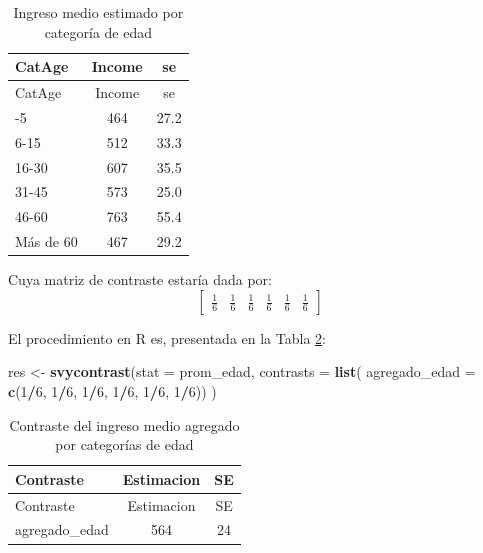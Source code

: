 \documentclass[
  spanish,
  12pt,
]{book}
\newenvironment{Shaded}{\begin{snugshade}}{\end{snugshade}}
\newcommand{\AttributeTok}[1]{\textcolor[rgb]{0.13,0.29,0.53}{#1}}
\newcommand{\DecValTok}[1]{\textcolor[rgb]{0.00,0.00,0.81}{#1}}
\newcommand{\FunctionTok}[1]{\textcolor[rgb]{0.13,0.29,0.53}{\textbf{#1}}}
\newcommand{\NormalTok}[1]{#1}
\newcommand{\OtherTok}[1]{\textcolor[rgb]{0.56,0.35,0.01}{#1}}
\newcommand{\SpecialCharTok}[1]{\textcolor[rgb]{0.81,0.36,0.00}{\textbf{#1}}}
\begin{document}
\begin{longtable}[]{@{}lcc@{}}
\caption{\label{tab:tab-prom-edad}Ingreso medio estimado por categoría de edad}\tabularnewline
\toprule\noalign{}
CatAge & Income & se \\
\midrule\noalign{}
\endfirsthead
\toprule\noalign{}
CatAge & Income & se \\
\midrule\noalign{}
\endhead
\bottomrule\noalign{}
\endlastfoot
0-5 & 464 & 27.2 \\
6-15 & 512 & 33.3 \\
16-30 & 607 & 35.5 \\
31-45 & 573 & 25.0 \\
46-60 & 763 & 55.4 \\
Más de 60 & 467 & 29.2 \\
\end{longtable}

Cuya matriz de contraste estaría dada por:
\[
\left[\begin{array}{cccccc}
\frac{1}{6} & \frac{1}{6} & \frac{1}{6} & \frac{1}{6} & \frac{1}{6} & \frac{1}{6}
\end{array}\right]
\]

El procedimiento en R es, presentada en la Tabla \ref{tab:tab-contraste-edad}:

\begin{Shaded}
\begin{Highlighting}[]
\NormalTok{res }\OtherTok{\textless{}{-}} \FunctionTok{svycontrast}\NormalTok{(}\AttributeTok{stat =}\NormalTok{ prom\_edad,}
                   \AttributeTok{contrasts =} \FunctionTok{list}\NormalTok{(}
                      \AttributeTok{agregado\_edad =} \FunctionTok{c}\NormalTok{(}\DecValTok{1}\SpecialCharTok{/}\DecValTok{6}\NormalTok{, }\DecValTok{1}\SpecialCharTok{/}\DecValTok{6}\NormalTok{, }\DecValTok{1}\SpecialCharTok{/}\DecValTok{6}\NormalTok{, }\DecValTok{1}\SpecialCharTok{/}\DecValTok{6}\NormalTok{, }\DecValTok{1}\SpecialCharTok{/}\DecValTok{6}\NormalTok{, }\DecValTok{1}\SpecialCharTok{/}\DecValTok{6}\NormalTok{))}
\NormalTok{                   )}
\end{Highlighting}
\end{Shaded}

\begin{longtable}[]{@{}lcc@{}}
\caption{\label{tab:tab-contraste-edad}Contraste del ingreso medio agregado por categorías de edad}\tabularnewline
\toprule\noalign{}
Contraste & Estimacion & SE \\
\midrule\noalign{}
\endfirsthead
\toprule\noalign{}
Contraste & Estimacion & SE \\
\midrule\noalign{}
\endhead
\bottomrule\noalign{}
\endlastfoot
agregado\_edad & 564 & 24 \\
\end{longtable}
\end{document}

